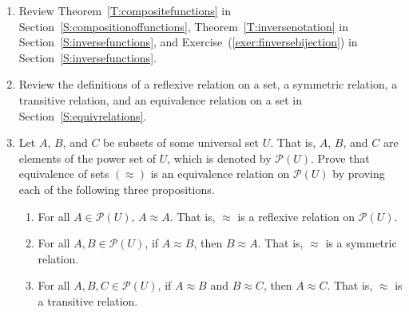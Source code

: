 \begin{previewactivity}\label{PA:equivsets2} \hfill
\begin{enumerate}
\item Review Theorem~\ref{T:compositefunctions} in Section~\ref{S:compositionoffunctions}, Theorem~\ref{T:inversenotation} in Section~\ref{S:inversefunctions}, and 
Exercise~(\ref{exer:finversebijection}) in Section~\ref{S:inversefunctions}.

\item Review the definitions of a reflexive relation on a set, a symmetric relation, a transitive relation, and an equivalence relation on a set in Section~\ref{S:equivrelations}.

\item Let $A$, $B$, and $C$ be subsets of some universal set $U$.  That is, $A$, $B$, and $C$ are elements of the power set of $U$, which is denoted by 
$\mathcal{P} \left( U \right)$.  Prove that equivalence of sets $\left( \approx \right)$ is an equivalence relation on $\mathcal{P}( U )$ by proving each of the following three propositions.

\begin{enumerate}
\item For all $A \in \mathcal{P}( U )$, $A \approx A$.  That is, $\approx$ is a reflexive relation on $\mathcal{P} \left( U \right)$.

\item For all $A, B \in \mathcal{P}( U )$, if $A \approx B$, then 
$B \approx A$.  That is, $\approx$ is a symmetric relation.

\item For all $A, B, C \in \mathcal{P}( U )$, if $A \approx B$ and 
$B \approx C$, then $A \approx C$.  That is,  $\approx$ is a transitive relation.
\end{enumerate}
\end{enumerate}
\end{previewactivity}
\hbreak


\endinput
